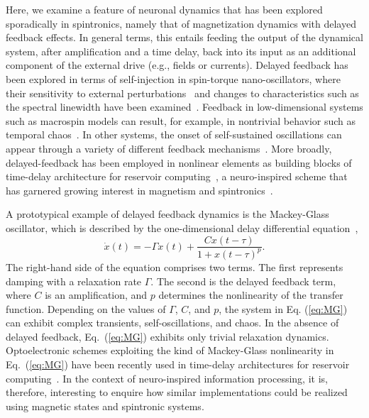 \documentclass[aip,reprint,amsmath,amssymb,floatfix,superscriptaddress]{revtex4-1}
\begin{document}
Here, we examine a feature of neuronal dynamics that has been explored sporadically in spintronics, namely that of magnetization dynamics with delayed feedback effects. In general terms, this entails feeding the output of the dynamical system, after amplification and a time delay, back into its input as an additional component of the external drive (e.g., fields or  currents). Delayed feedback has been explored in terms of self-injection in spin-torque nano-oscillators, where their sensitivity to external perturbations~\cite{Tiberkevich:2014eh} and changes to characteristics such as the spectral linewidth have been examined~\cite{Khalsa:2015kn, Tamaru:2016kl, Tsunegi:2016ka, Singh:2017gt, Singh:2018gr, williame:2020eo}. Feedback in low-dimensional systems such as macrospin models can result, for example, in nontrivial behavior such as temporal chaos~\cite{Williame:2019hd, Taniguchi:2019ej}. In other systems, the onset of self-sustained oscillations can appear through a variety of different feedback mechanisms~\cite{Dixit:2012ec, Kumar:2016io, Bhuktare:2017ja}. More broadly, delayed-feedback has been employed in nonlinear elements as building blocks of time-delay architecture for reservoir computing~\cite{Appeltant:2011jy, Larger:2017cx}, a neuro-inspired scheme that has garnered growing interest in magnetism and spintronics~\cite{Bourianoff:2018gp, Prychynenko:2018ii, Nakane:2018jc, Markovic:2019dz, Riou:2019ik, Araujo:2020ro, Yamaguchi:2020hg, Pinna:2020rc}. 


A prototypical example of delayed feedback dynamics is the Mackey-Glass oscillator, which is described by the one-dimensional delay differential equation~\cite{Mackey:1977dv},
%
\begin{equation}
\dot{x}(t) = -\Gamma x(t) + \frac{C x(t-\tau)}{1+x(t-\tau)^p}.
\label{eq:MG}
\end{equation}
%
The right-hand side of the equation comprises two terms. The first represents damping with a relaxation rate $\Gamma$. The second is the delayed feedback term, where $C$ is an amplification, and $p$ determines the nonlinearity of the transfer function. Depending on the values of $\Gamma$, $C$, and $p$, the system in Eq. (\ref{eq:MG}) can exhibit complex transients, self-oscillations, and chaos. In the absence of delayed feedback, Eq.~(\ref{eq:MG}) exhibits only trivial relaxation dynamics. Optoelectronic schemes exploiting the kind of Mackey-Glass nonlinearity in Eq.~(\ref{eq:MG}) have been recently used in time-delay architectures for reservoir computing~\cite{Appeltant:2011jy, Larger:2017cx}. In the context of neuro-inspired information processing, it is, therefore, interesting to enquire how similar implementations could be realized using magnetic states and spintronic systems.
\end{document}
